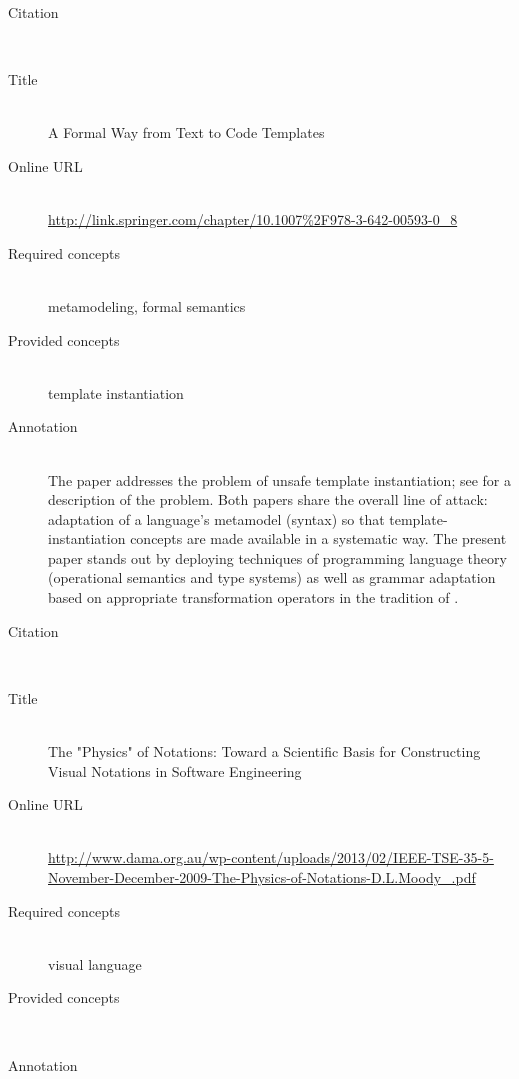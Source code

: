 \begin{description}
\item[Citation]\mbox{}\\
\cite{Wachsmuth09}
\item[Title]\mbox{}\\
A Formal Way from Text to Code Templates
\item[Online URL]\mbox{}\\
{\footnotesize\url{http://link.springer.com/chapter/10.1007%2F978-3-642-00593-0_8}}
\item[Required concepts]\mbox{}\\
metamodeling, formal semantics\item[Provided concepts]\mbox{}\\
template instantiation\item[Annotation]\mbox{}\\
The paper addresses the problem of unsafe template instantiation; see \cite{HeidenreichJSWB09} for a description of the problem. Both papers share the overall line of attack: adaptation of a language's metamodel (syntax) so that template-instantiation concepts are made available in a systematic way. The present paper stands out by deploying techniques of programming language theory (operational semantics and type systems) as well as grammar adaptation based on appropriate transformation operators in the tradition of \cite{Laemmel01}.
\end{description}

\begin{description}
\item[Citation]\mbox{}\\
\cite{Moody09}
\item[Title]\mbox{}\\
The "Physics" of Notations: Toward a Scientific Basis for Constructing Visual Notations in Software Engineering
\item[Online URL]\mbox{}\\
{\footnotesize\url{http://www.dama.org.au/wp-content/uploads/2013/02/IEEE-TSE-35-5-November-December-2009-The-Physics-of-Notations-D.L.Moody_.pdf}}
\item[Required concepts]\mbox{}\\
visual language\item[Provided concepts]\mbox{}\\
\item[Annotation]\mbox{}\\

\end{description}

